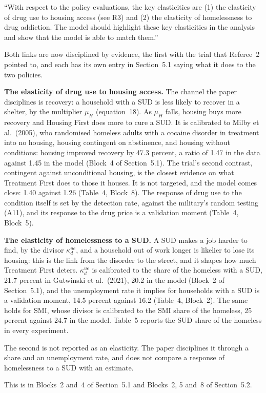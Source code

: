 \documentclass[11pt]{article}
\begin{document}
\begin{referee}
``With respect to the policy evaluations, the key elasticities are (1) the
elasticity of drug use to housing access (see R3) and (2) the elasticity of
homelessness to drug addiction. The model should highlight these key elasticities
in the analysis and show that the model is able to match them.''
\end{referee}
\begin{response}
Both links are now disciplined by evidence, the first with the trial that Referee~2
pointed to, and each has its own entry in Section~5.1 saying what it does to the
two policies.

\textbf{The elasticity of drug use to housing access.} The channel the paper
disciplines is recovery: a household with a SUD is less likely to recover in a
shelter, by the multiplier $\mu_H$ (equation~18). As $\mu_H$ falls, housing buys
more recovery and Housing First does more to cure a SUD. It is calibrated to Milby
et al.\ (2005), who randomised homeless adults with a cocaine disorder in treatment
into no housing, housing contingent on abstinence, and housing without conditions:
housing improved recovery by 47.3 percent, a ratio of 1.47 in the data against 1.45
in the model (Block~4 of Section~5.1). The trial's second contrast, contingent
against unconditional housing, is the closest evidence on what Treatment First does
to those it houses. It is not targeted, and the model comes close: 1.40 against
1.26 (Table~4, Block~8). The response of drug use to the condition itself is set by
the detection rate, against the military's random testing (A11), and its response
to the drug price is a validation moment (Table~4, Block~5).

\textbf{The elasticity of homelessness to a SUD.} A SUD makes a job harder to find,
by the divisor $\kappa^{ue}_d$, and a household out of work longer is likelier to
lose its housing: this is the link from the disorder to the street, and it shapes
how much Treatment First deters. $\kappa^{ue}_d$ is calibrated to the share of the
homeless with a SUD, 21.7 percent in Gutwinski et al.\ (2021), 20.2 in the model
(Block~2 of Section~5.1), and the unemployment rate it implies for households with a
SUD is a validation moment, 14.5 percent against 16.2 (Table~4, Block~2). The same
holds for SMI, whose divisor is calibrated to the SMI share of the homeless, 25
percent against 24.7 in the model. Table~5 reports the SUD share of the homeless in
every experiment.

\open The second is not reported as an elasticity. The paper disciplines it through
a share and an unemployment rate, and does not compare a response of homelessness to
a SUD with an estimate.

This is in Blocks~2 and~4 of Section~5.1 and Blocks~2, 5 and~8 of Section~5.2.
\end{response}
\end{document}
